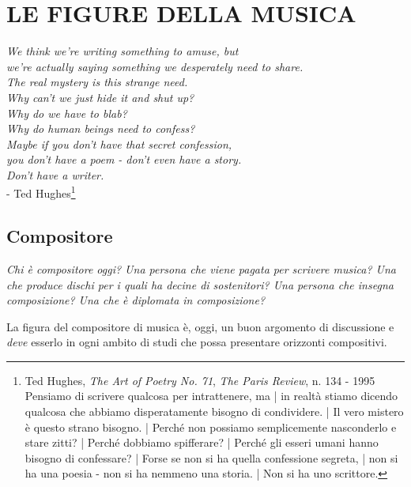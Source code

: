 
\chapter{LE FIGURE DELLA MUSICA}
\startcontents[chapters]

\begin{flushright}
		\textit{We think we're writing something to amuse, but \\
            we're actually saying something we desperately need to share. \\
            The real mystery is this strange need. \\
            Why can't we just hide it and shut up? \\
            Why do we have to blab? \\
            Why do human beings need to confess? \\
            Maybe if you don't have that secret confession, \\
            you don't have a poem - don't even have a story. \\
            Don't have a writer.} \\
            - Ted Hughes\footnote{Ted Hughes, \emph{The Art of Poetry No. 71}, \emph{The Paris Review}, n. 134 - 1995\\
						Pensiamo di scrivere qualcosa per intrattenere, ma | in realtà stiamo
						dicendo qualcosa che abbiamo disperatamente bisogno di condividere. |
						Il vero mistero è questo strano bisogno. | Perché non possiamo
						semplicemente nasconderlo e stare zitti? | Perché dobbiamo spifferare? |
						Perché gli esseri umani hanno bisogno di confessare? | Forse se non
						si ha quella confessione segreta, |	non si ha una poesia - non si
						ha nemmeno una storia. | Non si ha uno scrittore.}
\end{flushright}

\section{Compositore}

\emph{Chi è compositore oggi? Una persona che viene pagata per scrivere musica?
Una che produce dischi per i quali ha decine di sostenitori? Una persona che
insegna composizione? Una che è diplomata in composizione?}

La figura del compositore di musica è, oggi, un buon argomento di discussione e
\emph{deve} esserlo in ogni ambito di studi che possa presentare orizzonti compositivi.


